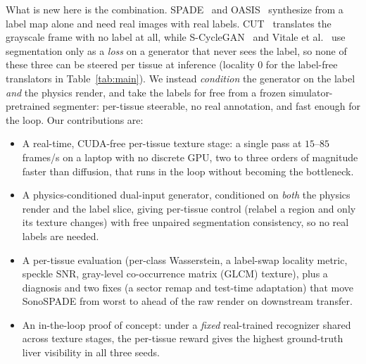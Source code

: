 \documentclass[runningheads]{llncs}
\begin{document}
What is new here is the combination. SPADE~\cite{park2019spade} and OASIS~\cite{sushko2021oasis} synthesize from a label map alone and need real images with real labels. CUT~\cite{park2020cut} translates the grayscale frame with no label at all, while S-CycleGAN~\cite{song2024scyclegan} and Vitale et al.~\cite{vitale2025realism} use segmentation only as a \emph{loss} on a generator that never sees the label, so none of these three can be steered per tissue at inference (locality $0$ for the label-free translators in Table~\ref{tab:main}). We instead \emph{condition} the generator on the label \emph{and} the physics render, and take the labels for free from a frozen simulator-pretrained segmenter: per-tissue steerable, no real annotation, and fast enough for the loop. 
Our contributions are:
\begin{itemize}
\item A real-time, CUDA-free per-tissue texture stage: a single pass at $15$--$85$ frames/s on a laptop with no discrete GPU, two to three orders of magnitude faster than diffusion, that runs in the loop without becoming the bottleneck.
\item A physics-conditioned dual-input generator, conditioned on \emph{both} the physics render and the label slice, giving per-tissue control (relabel a region and only its texture changes) with free unpaired segmentation consistency, so no real labels are needed.
\item A per-tissue evaluation (per-class Wasserstein, a label-swap locality metric, speckle SNR, gray-level co-occurrence matrix (GLCM) texture), plus a diagnosis and two fixes (a sector remap and test-time adaptation) that move SonoSPADE from worst to ahead of the raw render on downstream transfer.
\item An in-the-loop proof of concept: under a \emph{fixed} real-trained recognizer shared across texture stages, the per-tissue reward gives the highest ground-truth liver visibility in all three seeds.
\end{itemize}
\end{document}
